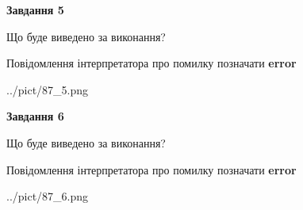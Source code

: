 \documentclass[12pt, ukrainian]{article}
\begin{document}
{{\begin {center}\textbf{Завдання 5}\end {center}}\par
Що буде виведено за виконання? \par
Повідомлення інтерпретатора про помилку позначати \textbf{error}

\begin{center}
	{../pict/87_5.png}
\end{center}
\newpage

{\begin {center}\textbf{Завдання 6}\end {center}}\par
Що буде виведено за виконання? \par
Повідомлення інтерпретатора про помилку позначати \textbf{error}

\begin{center}
	{../pict/87_6.png}
\end{center}
\newpage

}
\end{document}
